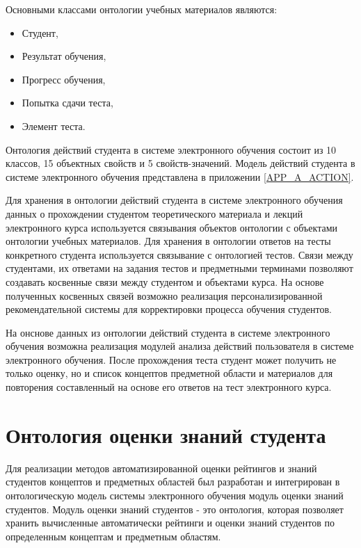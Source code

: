 Основными классами онтологии учебных материалов являются:

\begin{itemize}
\item Студент,
\item Результат обучения,
\item Прогресс обучения,
\item Попытка сдачи теста,
\item Элемент теста.
\end{itemize}

Онтология действий студента в системе электронного обучения состоит из 10 классов, 15 объектных свойств и 5 свойств-значений. Модель действий студента в системе электронного обучения представлена в приложении \ref{APP_A_ACTION}.

Для хранения в онтологии действий студента в системе электронного обучения данных о прохождении студентом теоретического материала и лекций электронного курса используется связывания объектов онтологии с объектами онтологии учебных материалов. Для хранения в онтологии  ответов на тесты конкретного студента используется связывание с онтологией тестов. Связи между студентами, их ответами на задания тестов и предметными терминами позволяют создавать косвенные связи между студентом и объектами курса. На основе полученных косвенных связей возможно реализация персонализированной рекомендательной системы для корректировки процесса обучения студентов. 

На онснове данных из онтологии действий студента в системе электронного обучения возможна реализация модулей анализа действий пользователя в системе электронного обучения. После прохождения теста студент может получить не только оценку, но и список концептов предметной области и материалов для повторения составленный на основе его ответов на тест электронного курса.





\section{Онтология оценки знаний студента} \label{sect2_5}

Для реализации методов автоматизированной оценки рейтингов и знаний студентов концептов и предметных областей был разработан и интегрирован в онтологическую модель системы электронного обучения модуль оценки знаний студентов. Модуль оценки знаний студентов - это онтология, которая позволяет хранить вычисленные автоматически рейтинги и оценки знаний студентов по определенным концептам и предметным областям. 

